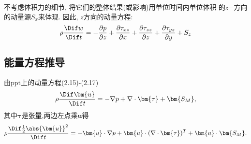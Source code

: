 \documentclass[12pt]{article}
\begin{document}
不考虑体积力的细节, 将它们的整体结果(或影响)用单位时间内单位体积 的$z$−方向的动量源$S_x$来体现. 因此, $z$方向的动量方程:
\begin{equation}
	\rho \frac{\Dif w}{\Dif t}=-\frac{\partial p}{\partial z}+\frac{\partial \tau_{x z}}{\partial x}+\frac{\partial \tau_{z z}}{\partial z}+\frac{\partial \tau_{y z}}{\partial y}+S_{z}
\end{equation}

\subsection{能量方程推导}

由ppt上的动量方程(2.15)-(2.17)
\begin{equation}
	\rho \frac{\Dif \bm{u}}{\Dif t} = - \nabla p + \nabla \cdot \bm{\tau} + \bm{S_M},
\end{equation}
其中$\bm{\tau}$是张量,两边左点乘$\bm{u}$得
\begin{equation}
	\rho \frac{\Dif \frac{1}{2} \abs{\bm{u}}^2}{\Dif t} = - \bm{u} \cdot \nabla p + \bm{u} \cdot (\nabla \cdot \bm{\tau})^T + \bm{u} \cdot \bm{S_M}.
\end{equation}
\end{document}
